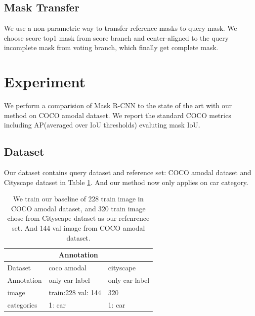 \documentclass[10pt,twocolumn,letterpaper]{article}
\begin{document}
\subsection{Mask Transfer}
We use a non-parametric way to transfer reference masks to query mask. We choose score top1 
mask from score branch and center-aligned to the query incomplete mask from voting branch, which 
finally get complete mask.



\section{Experiment}

We perform a  comparision of Mask R-CNN to the state of the art with our method on COCO amodal dataset. We report the standard COCO metrics including AP(averaged over IoU thresholds) evaluting mask IoU.  

\subsection{Dataset}
Our dataset contains query dataset and reference set: COCO amodal dataset and Cityscape dataset in  Table \ref{tab:dataset}. And our method now only applies on car category. 

\begin{table}[h]
   \begin{center}
		
      \begin{tabular}{lll}
      \multicolumn{3}{c}{Annotation} \\
      \hline
      Dataset  &    coco amodal     &  cityscape \\
      \hline
      Annotation & only car label & only car label\\
      image & train:228 val: 144 & 320\\
      categories & 1: car & 1: car\\ 
   
      \hline

      \end{tabular}
      
   
   \end{center}
   \caption{We train our baseline of 228 train image in COCO amodal dataset, and 320 train image chose from
   Cityscape dataset as our refenrence set. And 144 val image from COCO amodal dataset.}
      \label{tab:dataset}
\end{table}
\end{document}
